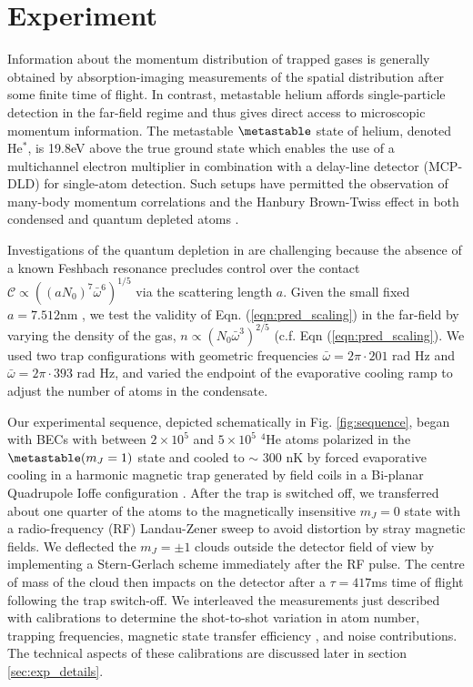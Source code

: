 	
	

\section{Experiment} 
	Information about the momentum distribution of trapped gases is generally obtained by absorption-imaging measurements of the spatial distribution after some finite time of flight. In contrast, metastable helium affords single-particle detection in the far-field regime and thus gives direct access to microscopic momentum information. The metastable $\metastable$ state of helium, denoted He$^*$, is 19.8eV above the true ground state \cite{Hodgman09} which enables the use of a multichannel electron multiplier in combination with a delay-line detector (MCP-DLD) \cite{Manning10} for single-atom detection. Such setups have permitted the observation of many-body momentum correlations \cite{Hodgman11,Dall13} and the Hanbury Brown-Twiss effect in both condensed \cite{Schellekens05,Jeltes07,Manning10,Dall11} and quantum depleted atoms \cite{Cayla20}. 
	
	Investigations of the quantum depletion in \mhe are challenging because the absence of a known Feshbach resonance precludes control over the contact $\mathcal{C}\propto((a N_0)^7\bar{\omega}^6)^{1/5}$ via the scattering length $a$. 
	Given the small fixed $a=7.512$nm \cite{Moal06}, we test the validity of Eqn. (\ref{eqn:pred_scaling}) in the far-field by varying the density of the gas, $n\propto\left(N_{0}\bar{\omega}^3\right)^{2/5}$ (c.f. Eqn (\ref{eqn:pred_scaling}). 
	We used two trap configurations with geometric frequencies $\bar{\omega} = 2\pi \cdot201$ rad Hz and $\bar{\omega} = 2\pi \cdot393$ rad Hz, and varied the endpoint of the evaporative cooling ramp to adjust the number of atoms in the condensate. 
	
	Our experimental sequence, depicted schematically in Fig. \ref{fig:sequence}, began with BECs with between $2\times 10^5$ and $5\times 10^5$ $^4$He atoms polarized in the $\metastable(m_J=1)$ state and cooled to $\sim$ 300 nK by forced evaporative cooling in a harmonic magnetic trap generated by field coils in a Bi-planar Quadrupole Ioffe configuration \cite{Dall07}. 
	After the trap is switched off, we transferred about one quarter of the atoms to the magnetically insensitive $m_J=0$ state with a radio-frequency (RF) Landau-Zener sweep to avoid distortion by stray magnetic fields.
	We deflected the $m_J=\pm 1$ clouds outside the detector field of view by implementing a Stern-Gerlach scheme immediately after the RF pulse. 
	The centre of mass of the cloud then impacts on the detector after a $\tau = 417$ms time of flight following the trap switch-off. 
	We interleaved the measurements just described with calibrations to determine the shot-to-shot variation in atom number, trapping frequencies, magnetic state transfer efficiency , and noise contributions. The technical aspects of these calibrations are discussed later in section \ref{sec:exp_details}.

